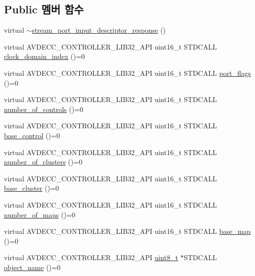 \subsection*{Public 멤버 함수}
\begin{DoxyCompactItemize}
\item 
virtual \hyperlink{classavdecc__lib_1_1stream__port__input__descriptor__response_aa3d80c2ab540a9eb9cc80c9805c6d91c}{$\sim$stream\+\_\+port\+\_\+input\+\_\+descriptor\+\_\+response} ()
\item 
virtual A\+V\+D\+E\+C\+C\+\_\+\+C\+O\+N\+T\+R\+O\+L\+L\+E\+R\+\_\+\+L\+I\+B32\+\_\+\+A\+PI uint16\+\_\+t S\+T\+D\+C\+A\+LL \hyperlink{classavdecc__lib_1_1stream__port__input__descriptor__response_aab7f93d403d8b73f8f4a8fb7c61ecded}{clock\+\_\+domain\+\_\+index} ()=0
\item 
virtual A\+V\+D\+E\+C\+C\+\_\+\+C\+O\+N\+T\+R\+O\+L\+L\+E\+R\+\_\+\+L\+I\+B32\+\_\+\+A\+PI uint16\+\_\+t S\+T\+D\+C\+A\+LL \hyperlink{classavdecc__lib_1_1stream__port__input__descriptor__response_a66bad2f1317cba04f0ea271f7181b58f}{port\+\_\+flags} ()=0
\item 
virtual A\+V\+D\+E\+C\+C\+\_\+\+C\+O\+N\+T\+R\+O\+L\+L\+E\+R\+\_\+\+L\+I\+B32\+\_\+\+A\+PI uint16\+\_\+t S\+T\+D\+C\+A\+LL \hyperlink{classavdecc__lib_1_1stream__port__input__descriptor__response_a5accf7abc7d231a0767ad5cac68b8b39}{number\+\_\+of\+\_\+controls} ()=0
\item 
virtual A\+V\+D\+E\+C\+C\+\_\+\+C\+O\+N\+T\+R\+O\+L\+L\+E\+R\+\_\+\+L\+I\+B32\+\_\+\+A\+PI uint16\+\_\+t S\+T\+D\+C\+A\+LL \hyperlink{classavdecc__lib_1_1stream__port__input__descriptor__response_ac1f5297533142234c764e84c01ce5a16}{base\+\_\+control} ()=0
\item 
virtual A\+V\+D\+E\+C\+C\+\_\+\+C\+O\+N\+T\+R\+O\+L\+L\+E\+R\+\_\+\+L\+I\+B32\+\_\+\+A\+PI uint16\+\_\+t S\+T\+D\+C\+A\+LL \hyperlink{classavdecc__lib_1_1stream__port__input__descriptor__response_a2ea8849b4f2d61dd26ed53e94316e93e}{number\+\_\+of\+\_\+clusters} ()=0
\item 
virtual A\+V\+D\+E\+C\+C\+\_\+\+C\+O\+N\+T\+R\+O\+L\+L\+E\+R\+\_\+\+L\+I\+B32\+\_\+\+A\+PI uint16\+\_\+t S\+T\+D\+C\+A\+LL \hyperlink{classavdecc__lib_1_1stream__port__input__descriptor__response_aa87ccba6a00a404146e569e70185d839}{base\+\_\+cluster} ()=0
\item 
virtual A\+V\+D\+E\+C\+C\+\_\+\+C\+O\+N\+T\+R\+O\+L\+L\+E\+R\+\_\+\+L\+I\+B32\+\_\+\+A\+PI uint16\+\_\+t S\+T\+D\+C\+A\+LL \hyperlink{classavdecc__lib_1_1stream__port__input__descriptor__response_acda32e14eb207ebd11856fab5172173c}{number\+\_\+of\+\_\+maps} ()=0
\item 
virtual A\+V\+D\+E\+C\+C\+\_\+\+C\+O\+N\+T\+R\+O\+L\+L\+E\+R\+\_\+\+L\+I\+B32\+\_\+\+A\+PI uint16\+\_\+t S\+T\+D\+C\+A\+LL \hyperlink{classavdecc__lib_1_1stream__port__input__descriptor__response_aec19e0ab011108a60ce3e82bc682e5e0}{base\+\_\+map} ()=0
\item 
virtual A\+V\+D\+E\+C\+C\+\_\+\+C\+O\+N\+T\+R\+O\+L\+L\+E\+R\+\_\+\+L\+I\+B32\+\_\+\+A\+PI \hyperlink{stdint_8h_aba7bc1797add20fe3efdf37ced1182c5}{uint8\+\_\+t} $\ast$S\+T\+D\+C\+A\+LL \hyperlink{classavdecc__lib_1_1descriptor__response__base_a133f7774946d80f82b8aaaa4cfbb7361}{object\+\_\+name} ()=0
\end{DoxyCompactItemize}


